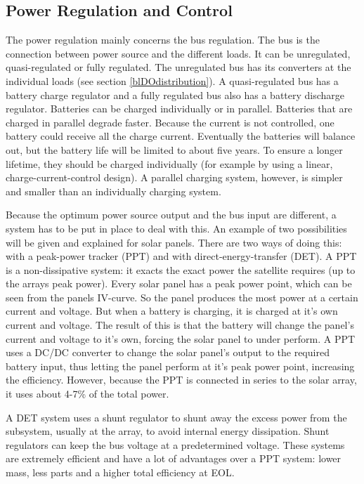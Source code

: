 \subsection{Power Regulation and Control}
\label{blDOregulation}

The power regulation mainly concerns the bus regulation. The bus is the connection between power source and the different loads. It can be unregulated, quasi-regulated or fully regulated. The unregulated bus has its converters at the individual loads (see section \ref{blDOdistribution}).
A quasi-regulated bus has a battery charge regulator and a fully regulated bus also has a battery discharge regulator.
Batteries can be charged individually or in parallel. Batteries that are charged in parallel degrade faster. Because the current is not controlled, one battery could receive all the charge current. Eventually the batteries will balance out, but the battery life will be limited to about five years. To ensure a longer lifetime, they should be charged individually (for example by using a linear, charge-current-control design). A parallel charging system, however, is simpler and smaller than an individually charging system.

Because the optimum power source output and the bus input are different, a system has to be put in place to deal with this. An example of two possibilities will be given and explained for solar panels.
There are two ways of doing this: with a peak-power tracker (PPT) and with direct-energy-transfer (DET). 
A PPT is a non-dissipative system: it exacts the exact power the satellite requires (up to the arrays peak power). Every solar panel has a peak power point, which can be seen from the panels IV-curve. So the panel produces the most power at a certain current and voltage. But when a battery is charging, it is charged at it's own current and voltage. The result of this is that the battery will change the panel's current and voltage to it's own, forcing the solar panel to under perform. A PPT uses a DC/DC converter to change the solar panel's output to the required battery input, thus letting the panel perform at it's peak power point, increasing the efficiency. However, because the PPT is connected in series to the solar array, it uses about 4-7\% of the total power.

A DET system uses a shunt regulator to shunt away the excess power from the subsystem, usually at the array, to avoid internal energy dissipation. Shunt regulators can keep the bus voltage at a predetermined voltage. These systems are extremely efficient and have a lot of advantages over a PPT system: lower mass, less parts and a higher total efficiency at \ac{EOL}.

